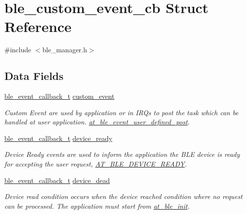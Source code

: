 \hypertarget{structble__custom__event__cb}{}\section{ble\+\_\+custom\+\_\+event\+\_\+cb Struct Reference}
\label{structble__custom__event__cb}


{\ttfamily \#include $<$ble\+\_\+manager.\+h$>$}

\subsection*{Data Fields}
\begin{DoxyCompactItemize}
\item 
\mbox{\hyperlink{ble__manager_8h_a04ce4bb8cb8282f2762e3924b1773cc9}{ble\+\_\+event\+\_\+callback\+\_\+t}} \mbox{\hyperlink{structble__custom__event__cb_a7dcbd675e80d7e2b00fef81e694db3d3}{custom\+\_\+event}}
\begin{DoxyCompactList}\small\item\em Custom Event are used by application or in I\+RQ\textquotesingle{}s to post the task which can be handled at user application. \mbox{\hyperlink{group__misc__group_gadc0a033c5b84eee9ffd4c6c394be2520}{at\+\_\+ble\+\_\+event\+\_\+user\+\_\+defined\+\_\+post}}. \end{DoxyCompactList}\item 
\mbox{\hyperlink{ble__manager_8h_a04ce4bb8cb8282f2762e3924b1773cc9}{ble\+\_\+event\+\_\+callback\+\_\+t}} \mbox{\hyperlink{structble__custom__event__cb_a31eb831ce5e174b53908aab177569975}{device\+\_\+ready}}
\begin{DoxyCompactList}\small\item\em Device Ready event\textquotesingle{}s are used to inform the application the B\+LE device is ready for accepting the user request, \mbox{\hyperlink{at__ble__api_8h_a3324640b95f33169515f89738ed5baeba4e0471236a4d570dc8e5bc42937f2dc4}{A\+T\+\_\+\+B\+L\+E\+\_\+\+D\+E\+V\+I\+C\+E\+\_\+\+R\+E\+A\+DY}}. \end{DoxyCompactList}\item 
\mbox{\hyperlink{ble__manager_8h_a04ce4bb8cb8282f2762e3924b1773cc9}{ble\+\_\+event\+\_\+callback\+\_\+t}} \mbox{\hyperlink{structble__custom__event__cb_abbbc9530a8c2882e78f5948698f4b564}{device\+\_\+dead}}
\begin{DoxyCompactList}\small\item\em Device read condition occurs when the device reached condition where no request can be processed. The application must start from \mbox{\hyperlink{group__gap__dev__config__group_gaa972214071cfa8767b5145eacfa03a90}{at\+\_\+ble\+\_\+init}}. \end{DoxyCompactList}\item 

\end{DoxyCompactItemize}

